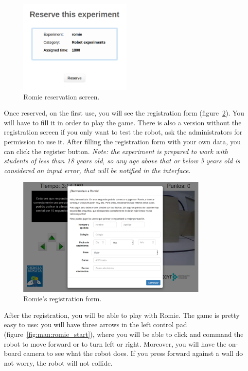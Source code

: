 \begin{figure}[!htbp]
	\centering
	\includegraphics[width=0.5\textwidth]{fig/manuals/trivial/romie-reserve}
	\caption{Romie reservation screen.}
	\label{fig:man:romie_reserve}
\end{figure}

Once reserved, on the first use, you will see the registration form
(figure~\ref{fig:man:romie_register}). You will have to fill it in order to play the game. There is
also a version without the registration screen if you only want to test the robot, ask the
administrators for permission to use it. After filling the registration form  with your own data,
you can click the register button. \emph{Note: the experiment is prepared to work with students of
less than 18 years old, so any age above that or below 5 years old is considered an input error,
that will be notified in the interface}.

\begin{figure}[!htbp]
	\centering
	\includegraphics[width=0.85\textwidth]{fig/manuals/trivial/romie-register}
	\caption{Romie's registration form.}
	\label{fig:man:romie_register}
\end{figure}

After the registration, you will be able to play with Romie. The game is pretty easy to use: you
will have three arrows in the left control pad (figure~\ref{fig:man:romie_start}), where you will be
able to click and command the robot to move forward or to turn left or right. Moreover, you will
have the on-board camera to see what the robot does. If you press forward against a wall do not
worry, the robot will not collide.

